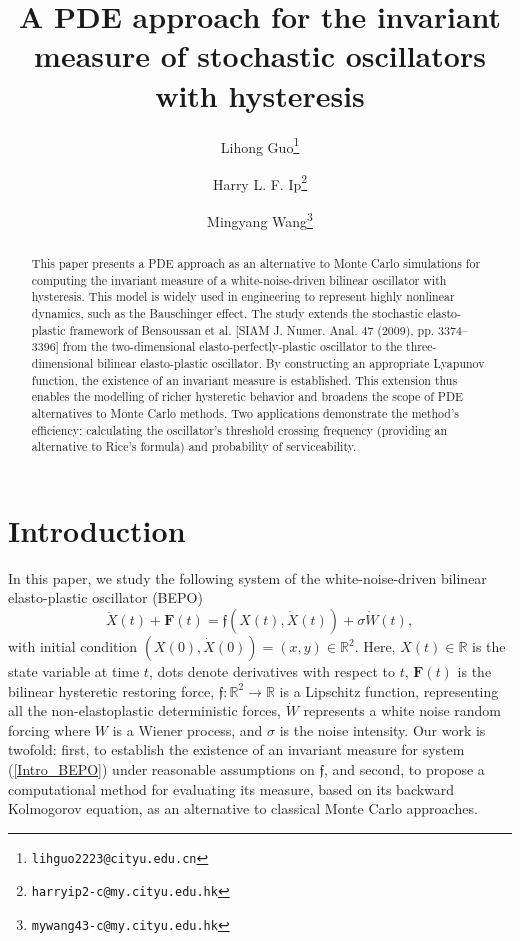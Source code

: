 \documentclass[12pt]{article}
\numberwithin{equation}{section}
\def \R{\mathbb R}
\newcommand{\email}[1]{\thanks{\texttt{#1}}}
\begin{document}
\title{A PDE approach for the invariant measure of stochastic oscillators with hysteresis}
\author[1]{Lihong Guo\email{lihguo2223@cityu.edu.cn}}
\author[2]{Harry L. F. Ip\email{harryip2-c@my.cityu.edu.hk}}
\author[2]{Mingyang Wang\email{mywang43-c@my.cityu.edu.hk}}

\date{ }
\maketitle
\vspace{-5em}
\begin{abstract}
This paper presents a PDE approach as an alternative to Monte Carlo simulations 
for computing the invariant measure of a white-noise-driven bilinear oscillator 
with hysteresis. This model is widely used in engineering to represent highly nonlinear dynamics, 
such as the Bauschinger effect. 
The study extends the stochastic elasto-plastic framework of Bensoussan et al. 
[SIAM J. Numer. Anal. 47 (2009), pp. 3374--3396] 
from the two-dimensional elasto-perfectly-plastic oscillator to the three-dimensional bilinear elasto-plastic oscillator. 
By constructing an appropriate Lyapunov function, 
the existence of an invariant measure is established. 
This extension thus enables the modelling of richer hysteretic behavior 
and broadens the scope of PDE alternatives to Monte Carlo methods. 
Two applications demonstrate the method's efficiency: 
calculating the oscillator's threshold crossing frequency (providing an alternative to Rice's formula) and probability of serviceability. 
\end{abstract}


\section{Introduction}\label{intro}
In this paper, we study the following system of the white-noise-driven bilinear elasto-plastic oscillator (BEPO)  
\begin{equation}\label{Intro_BEPO}
	\ddot{X}(t) + \mathbf{F}(t) 
	= \mathfrak{f}(X(t),\dot{X}(t))+ \sigma \dot{W}(t), 
\end{equation}
with initial condition $(X(0),\dot{X}(0)) = (x,y)\in\R^{2}$. 
Here, $X(t) \in \R$ is the state variable at time $t$, 
dots denote derivatives with respect to $t$, 
$\mathbf{F}(t)$ is the bilinear hysteretic restoring force,  
$\mathfrak{f}: \R^{2} \rightarrow \R$ is a Lipschitz function,  
representing all the non-elastoplastic deterministic forces, 
$\dot{W}$ represents a white noise random forcing where $W$ is a Wiener process, 
and $\sigma$ is the noise intensity.  
Our work is twofold: first, to establish the existence of an invariant measure for system (\ref{Intro_BEPO}) 
under reasonable assumptions on $\mathfrak{f}$, 
and second, to propose a computational method for evaluating its measure, 
based on its backward Kolmogorov equation, 
as an alternative to classical Monte Carlo approaches.
\end{document}
